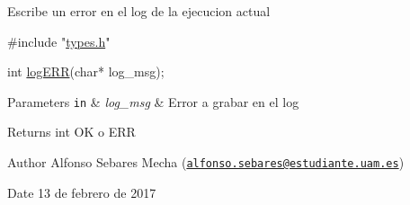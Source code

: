 Escribe un error en el log de la ejecucion actual


\begin{DoxyCode}
\textcolor{preprocessor}{#include "\hyperlink{types_8h}{types.h}"}

\textcolor{keywordtype}{int} \hyperlink{logger_8h_a9487660b2ec318326782a9d9e32f8461}{logERR}(\textcolor{keywordtype}{char}* log\_msg);
\end{DoxyCode}



\begin{DoxyParams}[1]{Parameters}
\mbox{\tt in}  & {\em log\-\_\-msg} & Error a grabar en el log\\
\hline
\end{DoxyParams}
\begin{DoxyReturn}{Returns}
int O\-K o E\-R\-R 
\end{DoxyReturn}
\begin{DoxyAuthor}{Author}
Alfonso Sebares Mecha (\href{mailto:alfonso.sebares@estudiante.uam.es}{\tt alfonso.\-sebares@estudiante.\-uam.\-es})
\end{DoxyAuthor}
\begin{DoxyDate}{Date}
13 de febrero de 2017
\end{DoxyDate}


 